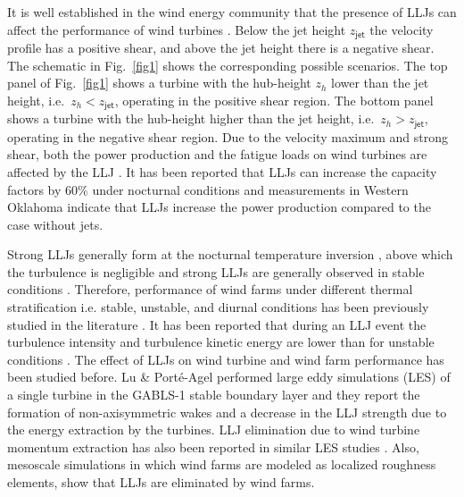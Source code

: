 \documentclass[%
 aip,
 amsmath,amssymb,
preprint,%
author-numerical,%
]{revtex4-1}
\begin{document}
It is well established in the wind energy community that the presence of LLJs can affect the performance of wind turbines \cite{sis78}. Below the jet height $z_\mathsf{jet}$ the velocity profile has a positive shear, and above the jet height there is a negative shear. The schematic in Fig.\ \ref{fig1} shows the corresponding possible scenarios. The top panel of Fig.\ \ref{fig1} shows a turbine with the hub-height $z_h$ lower than the jet height, i.e.\ $z_h < z_\mathsf{jet}$, operating in the positive shear region. The bottom panel shows a turbine with the hub-height higher than the jet height, i.e.\ $z_h > z_\mathsf{jet}$, operating in the negative shear region. Due to the velocity maximum and strong shear, both the power production and the fatigue loads on wind turbines are affected by the LLJ \cite{gut17}. It has been reported that LLJs can increase the capacity factors by 60\% under nocturnal conditions \cite{wil15b} and measurements in Western Oklahoma\cite{gre09} indicate that LLJs increase the power production compared to the case without jets.

Strong LLJs generally form at the nocturnal temperature inversion \cite{baa09}, above which the turbulence is negligible and strong LLJs are generally observed in stable conditions \cite{bla57}. {\color{black} Therefore, performance of wind farms under different thermal stratification i.e. stable, unstable, and diurnal conditions has been previously studied in the literature \cite{dor15, abk16, ali18b, ali19, all18}.} {\color{black}It has been reported that during an LLJ event the turbulence intensity and turbulence kinetic energy are lower than for unstable conditions \cite{gut16}.} The effect of LLJs on wind turbine and wind farm performance has been studied before. Lu \& Port{\'e}-Agel \cite{lu11} performed large eddy simulations (LES) of a single turbine in the GABLS-1 stable boundary layer and they report the formation of non-axisymmetric wakes and a decrease in the LLJ strength due to the energy extraction by the turbines. {\color{black}LLJ elimination due to wind turbine momentum extraction has also been reported in similar LES studies \cite{abk16, bha15, sha17d, ali17}.} Also, mesoscale simulations in which wind farms are modeled as localized roughness elements, show that LLJs are eliminated by wind farms\cite{fit13}.
\end{document}
